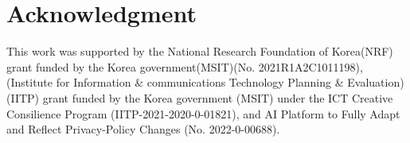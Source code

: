 \section*{Acknowledgment}
This work was supported by the National Research Foundation of Korea(NRF) grant funded by the Korea government(MSIT)(No. 2021R1A2C1011198), (Institute for Information \& communications Technology Planning \& Evaluation) (IITP) grant funded by the Korea government (MSIT) under the ICT Creative Consilience Program (IITP-2021-2020-0-01821), and AI Platform to Fully Adapt and Reflect Privacy-Policy Changes (No. 2022-0-00688).

\balance

 




